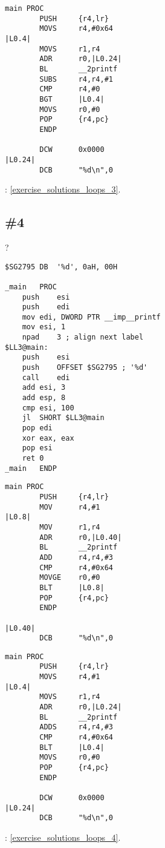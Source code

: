 \begin{lstlisting}[caption=Keil 5.03 (\ThumbMode)]
main PROC
        PUSH     {r4,lr}
        MOVS     r4,#0x64
|L0.4|
        MOVS     r1,r4
        ADR      r0,|L0.24|
        BL       __2printf
        SUBS     r4,r4,#1
        CMP      r4,#0
        BGT      |L0.4|
        MOVS     r0,#0
        POP      {r4,pc}
        ENDP

        DCW      0x0000
|L0.24|
        DCB      "%d\n",0
\end{lstlisting}

: \ref{exercise_solutions_loops_3}.

\subsection{\Exercise \#4}
\label{exercise_loops_4}

?

\begin{lstlisting}[caption=MSVC 2010 /Ox]
$SG2795	DB	'%d', 0aH, 00H

_main	PROC
	push	esi
	push	edi
	mov	edi, DWORD PTR __imp__printf
	mov	esi, 1
	npad	3 ; align next label
$LL3@main:
	push	esi
	push	OFFSET $SG2795 ; '%d'
	call	edi
	add	esi, 3
	add	esp, 8
	cmp	esi, 100
	jl	SHORT $LL3@main
	pop	edi
	xor	eax, eax
	pop	esi
	ret	0
_main	ENDP
\end{lstlisting}

\begin{lstlisting}[caption=Keil 5.03 (\ARMMode)]
main PROC
        PUSH     {r4,lr}
        MOV      r4,#1
|L0.8|
        MOV      r1,r4
        ADR      r0,|L0.40|
        BL       __2printf
        ADD      r4,r4,#3
        CMP      r4,#0x64
        MOVGE    r0,#0
        BLT      |L0.8|
        POP      {r4,pc}
        ENDP

|L0.40|
        DCB      "%d\n",0
\end{lstlisting}

\begin{lstlisting}[caption=Keil 5.03 (\ThumbMode)]
main PROC
        PUSH     {r4,lr}
        MOVS     r4,#1
|L0.4|
        MOVS     r1,r4
        ADR      r0,|L0.24|
        BL       __2printf
        ADDS     r4,r4,#3
        CMP      r4,#0x64
        BLT      |L0.4|
        MOVS     r0,#0
        POP      {r4,pc}
        ENDP

        DCW      0x0000
|L0.24|
        DCB      "%d\n",0
\end{lstlisting}

: \ref{exercise_solutions_loops_4}.